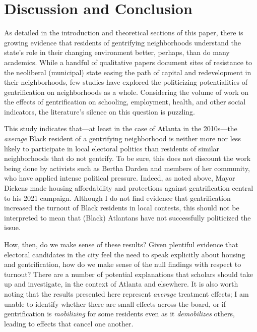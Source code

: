 \documentclass[
  12pt,
]{article}
\begin{document}
\hypertarget{discussion-and-conclusion}{%
\section{Discussion and Conclusion}\label{discussion-and-conclusion}}

As detailed in the introduction and theoretical sections of this paper, there is growing evidence that residents of gentrifying neighborhoods understand the state's role in their changing environment better, perhaps, than do many academics. While a handful of qualitative papers document sites of resistance to the neoliberal (municipal) state easing the path of capital and redevelopment in their neighborhoods, few studies have explored the politicizing potentialities of gentrification on neighborhoods as a whole. Considering the volume of work on the effects of gentrification on schooling, employment, health, and other social indicators, the literature's silence on this question is puzzling.

This study indicates that---at least in the case of Atlanta in the 2010s---the \emph{average} Black resident of a gentrifying neighborhood is neither more nor less likely to participate in local electoral politics than residents of similar neighborhoods that do not gentrify. To be sure, this does not discount the work being done by activists such as Bertha Darden and members of her community, who have applied intense political pressure. Indeed, as noted above, Mayor Dickens made housing affordability and protections against gentrification central to his 2021 campaign. Although I do not find evidence that gentrification increased the turnout of Black residents in local contests, this should not be interpreted to mean that (Black) Atlantans have not successfully politicized the issue.

How, then, do we make sense of these results? Given plentiful evidence that electoral candidates in the city feel the need to speak explicitly about housing and gentrification, how do we make sense of the null findings with respect to turnout? There are a number of potential explanations that scholars should take up and investigate, in the context of Atlanta and elsewhere. It is also worth noting that the results presented here represent \emph{average} treatment effects; I am unable to identify whether there are small effects across-the-board, or if gentrification is \emph{mobilizing} for some residents even as it \emph{demobilizes} others, leading to effects that cancel one another.
\end{document}
